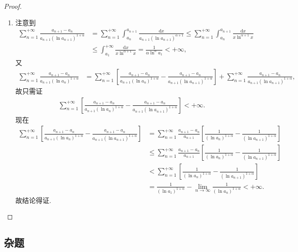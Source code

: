 \documentclass[../../main.tex]{subfiles}%
\begin{document}
\begin{proof}
\begin{enumerate}[(1)]
\item 注意到
\begin{align*}
\sum_{n=1}^{+\infty} \frac{a_{n+1} - a_n}{a_{n+1}(\ln a_{n+1})^{1+\alpha}} &= \sum_{n=1}^{+\infty} \int_{a_n}^{a_{n+1}} \frac{\mathrm{d}x}{a_{n+1}(\ln a_{n+1})^{\alpha + 1}} \leqslant \sum_{n=1}^{+\infty} \int_{a_n}^{a_{n+1}} \frac{\mathrm{d}x}{x\ln^{\alpha + 1}x} \\
&\leqslant \int_{a_1}^{+\infty} \frac{\mathrm{d}x}{x\ln^{\alpha + 1}x} = \frac{1}{\alpha \ln^{\alpha}a_1} < +\infty,
\end{align*}
又
\begin{align*}
\sum_{n=1}^{+\infty} \frac{a_{n+1} - a_n}{a_{n+1}(\ln a_n)^{1+\alpha}} &= \sum_{n=1}^{+\infty} \left[ \frac{a_{n+1} - a_n}{a_{n+1}(\ln a_n)^{1+\alpha}} - \frac{a_{n+1} - a_n}{a_{n+1}(\ln a_{n+1})^{1+\alpha}} \right] + \sum_{n=1}^{+\infty} \frac{a_{n+1} - a_n}{a_{n+1}(\ln a_{n+1})^{1+\alpha}},
\end{align*}
故只需证
\begin{align*}
\sum_{n=1}^{+\infty} \left[ \frac{a_{n+1} - a_n}{a_{n+1}(\ln a_n)^{1+\alpha}} - \frac{a_{n+1} - a_n}{a_{n+1}(\ln a_{n+1})^{1+\alpha}} \right] < +\infty.
\end{align*}
现在
\begin{align*}
\sum_{n=1}^{+\infty} \left[ \frac{a_{n+1} - a_n}{a_{n+1}(\ln a_n)^{1+\alpha}} - \frac{a_{n+1} - a_n}{a_{n+1}(\ln a_{n+1})^{1+\alpha}} \right] &= \sum_{n=1}^{+\infty} \frac{a_{n+1} - a_n}{a_{n+1}} \left[ \frac{1}{(\ln a_n)^{1+\alpha}} - \frac{1}{(\ln a_{n+1})^{1+\alpha}} \right] \\
&\leqslant \sum_{n=1}^{+\infty} \frac{a_{n+1} - a_n}{a_{n+1}} \left[ \frac{1}{(\ln a_n)^{1+\alpha}} - \frac{1}{(\ln a_{n+1})^{1+\alpha}} \right] \\
&< \sum_{n=1}^{+\infty} \left[ \frac{1}{(\ln a_n)^{1+\alpha}} - \frac{1}{(\ln a_{n+1})^{1+\alpha}} \right] \\
&= \frac{1}{(\ln a_1)^{1+\alpha}} - \lim_{n \rightarrow \infty} \frac{1}{(\ln a_n)^{1+\alpha}} < +\infty.
\end{align*}
故结论得证.
\end{enumerate}

\end{proof}



\subsection{杂题}
\end{document}
